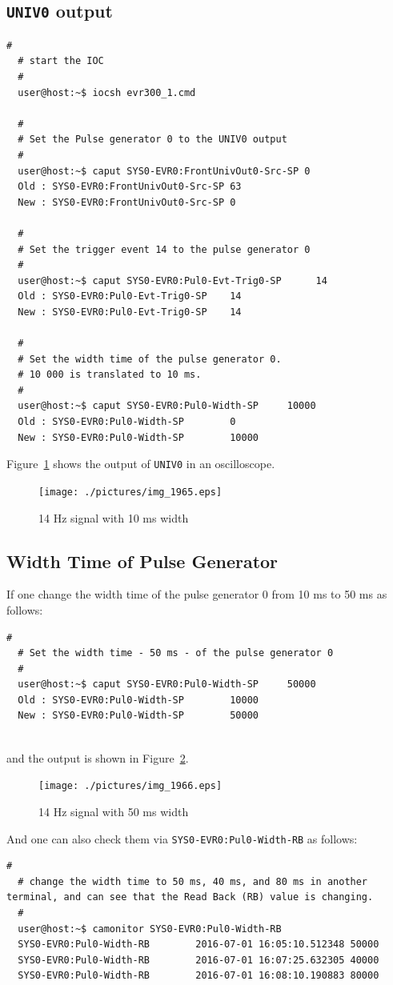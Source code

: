 \documentclass[11pt
  , a4paper
  , article
  , oneside
  , showtrims
]{memoir}
\begin{document}
\subsection{\texttt{UNIV0} output}
\begin{lstlisting}[style=termstyle]
  #
  # start the IOC
  #
  user@host:~$ iocsh evr300_1.cmd

  #
  # Set the Pulse generator 0 to the UNIV0 output
  # 
  user@host:~$ caput SYS0-EVR0:FrontUnivOut0-Src-SP 0
  Old : SYS0-EVR0:FrontUnivOut0-Src-SP 63
  New : SYS0-EVR0:FrontUnivOut0-Src-SP 0

  #
  # Set the trigger event 14 to the pulse generator 0
  #
  user@host:~$ caput SYS0-EVR0:Pul0-Evt-Trig0-SP      14
  Old : SYS0-EVR0:Pul0-Evt-Trig0-SP    14
  New : SYS0-EVR0:Pul0-Evt-Trig0-SP    14

  #
  # Set the width time of the pulse generator 0.
  # 10 000 is translated to 10 ms.
  #
  user@host:~$ caput SYS0-EVR0:Pul0-Width-SP     10000
  Old : SYS0-EVR0:Pul0-Width-SP        0
  New : SYS0-EVR0:Pul0-Width-SP        10000
\end{lstlisting}
Figure~\ref{fig:14Hz} shows the output of \texttt{UNIV0} in an oscilloscope. 
\begin{figure}[!ht]
  \centering
    \texttt{[image: ./pictures/img\_1965.eps]}
  \caption{14 Hz signal with 10 ms width}
  \label{fig:14Hz}
\end{figure}


\subsection{Width Time of Pulse Generator}
If one change the width time of the pulse generator 0 from 10 ms to 50 ms as follows:
\begin{lstlisting}[style=termstyle]
  #
  # Set the width time - 50 ms - of the pulse generator 0 
  #
  user@host:~$ caput SYS0-EVR0:Pul0-Width-SP     50000
  Old : SYS0-EVR0:Pul0-Width-SP        10000
  New : SYS0-EVR0:Pul0-Width-SP        50000
  
\end{lstlisting}
and the output is shown in Figure~\ref{fig:50ms}.
\begin{figure}[!ht]
  \centering
    \texttt{[image: ./pictures/img\_1966.eps]}
  \caption{14 Hz signal with 50 ms width}
  \label{fig:50ms}
\end{figure}

And one can also check them via \texttt{SYS0-EVR0:Pul0-Width-RB} as follows:
\begin{lstlisting}[style=termstyle]
  #
  # change the width time to 50 ms, 40 ms, and 80 ms in another terminal, and can see that the Read Back (RB) value is changing.
  #
  user@host:~$ camonitor SYS0-EVR0:Pul0-Width-RB
  SYS0-EVR0:Pul0-Width-RB        2016-07-01 16:05:10.512348 50000
  SYS0-EVR0:Pul0-Width-RB        2016-07-01 16:07:25.632305 40000
  SYS0-EVR0:Pul0-Width-RB        2016-07-01 16:08:10.190883 80000
  
\end{lstlisting}
\end{document}
